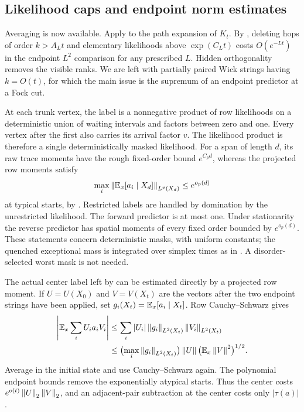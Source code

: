 \subsection{Likelihood caps and endpoint norm estimates}
\label{subsec:hidden-caps}

Averaging is now available. Apply  to the
path expansion of $K_t$. By , deleting hops of
order $k>A_Lt$ and elementary likelihoods above $\exp(C_Lt)$ costs
$O(e^{-Lt})$ in the endpoint $L^2$ comparison for any prescribed $L$.
Hidden orthogonality removes the visible ranks. We are left with
partially paired Wick strings having $k=O(t)$, for which the main
issue is the supremum of an endpoint predictor at a Fock cut.

At each trunk vertex, the label is a nonnegative product of row
likelihoods on a deterministic union of waiting intervals and factors
between zero and one. Every vertex after the first also carries its
arrival factor $v$. The likelihood product is therefore a single
deterministically masked likelihood. For a span of length $d$, its raw
trace moments have the rough fixed-order bound $e^{C_pd}$, whereas
the projected row moments satisfy
\begin{equation}\label{eq:hidden-projected-label-moments}
 \max_i\left\lVert \mathbb E_x[a_i\mid X_d]\right\rVert_{L^p(X_d)}
 \leq e^{o_p(d)}
\end{equation}
at typical starts, by . Restricted
labels are handled by domination by the unrestricted likelihood.
The forward predictor is at most one. Under stationarity the reverse
predictor has spatial moments of every fixed order bounded by
$e^{o_p(d)}$. These statements concern deterministic masks, with
uniform constants; the quenched exceptional mass is integrated over
simplex times as in . A
disorder-selected worst mask is not needed.

The actual center label left by  can be
estimated directly by a projected row moment. If $U=U(X_0)$ and $V=V(X_t)$ are the vectors
after the two endpoint strings have been applied, set
$g_i(X_t)=\mathbb E_x[a_i\mid X_t]$. Row Cauchy--Schwarz gives
\begin{align}
 \left\lvert \mathbb E_x\sum_iU_i a_iV_i\right\rvert
 &\leq\sum_i |U_i|\left\lVert g_i\right\rVert_{L^2(X_t)}
                         \left\lVert V_i\right\rVert_{L^2(X_t)}\notag\\
 &\leq\bigl(\max_i\left\lVert g_i\right\rVert_{L^2(X_t)}\bigr)
               \left\lVert U\right\rVert\bigl(\mathbb E_x\left\lVert V\right\rVert^2\bigr)^{1/2}.
 \label{eq:hidden-center-row-cs}
\end{align}
Average in the initial state and use Cauchy--Schwarz again. The
polynomial endpoint bounds remove the exponentially atypical starts.
Thus the center costs $e^{o(t)}\left\lVert U\right\rVert_2\left\lVert V\right\rVert_2$, and an
adjacent-pair subtraction at the center costs only $|\tau(a)|$.

